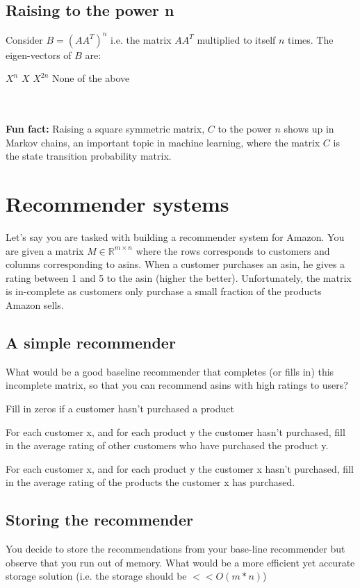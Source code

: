 \documentclass{exam}
\begin{document}
\subsection{Raising to the power n}
Consider $B = (AA^T)^n$ i.e. the matrix $AA^T$ multiplied to itself $n$ times.
The eigen-vectors of $B$ are: \\
\begin{oneparchoices}
\choice $X^n$
\choice $X$
\choice $X^{2n}$
\choice None of the above
\end{oneparchoices}
\\
\vspace{5mm}
\\
\textbf{Fun fact:} Raising a square symmetric matrix, $C$ to the power $n$ shows up in Markov chains, an important topic in machine learning,
where the matrix $C$ is the state transition probability matrix.

\section{Recommender systems}
Let's say you are tasked with building a recommender system for Amazon.
You are given a matrix $M \in \mathbb{R}^{m \times n}$ where the rows corresponds to customers
and columns corresponding to asins. When a customer purchases an asin, he gives
a rating between 1 and 5 to the asin (higher the better). Unfortunately, the matrix
is in-complete as customers only purchase a small fraction of the products Amazon sells.
\subsection{A simple recommender}
What would be a good baseline recommender that completes (or fills in) this incomplete matrix,
so that you can recommend asins with high ratings to users?

\begin{choices}
 \choice Fill in zeros if a customer hasn't purchased a product
 
  \choice For each customer x, and for each product y the customer hasn't purchased, fill in the average rating of other customers who have purchased the product y.
  
 \choice For each customer x, and for each product y the customer x hasn't purchased, fill in the average rating of the products
 the customer x has purchased.
 
\end{choices}

\subsection{Storing the recommender}
You decide to store the recommendations from your base-line recommender but observe that you run out of memory.
What would be a more efficient yet accurate storage solution (i.e. the storage should be $ << O(m*n)$)
\end{document}
